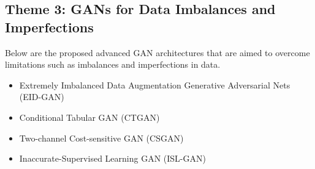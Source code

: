\documentclass[12pt,a4paper]{article}
\begin{document}





\subsection{Theme 3: GANs for Data Imbalances and Imperfections}
Below are the proposed advanced GAN architectures that are aimed to overcome limitations such as imbalances and imperfections in data.
\begin{itemize}
    \item Extremely Imbalanced Data Augmentation Generative Adversarial Nets (EID-GAN)
    \item Conditional Tabular GAN (CTGAN)
    \item Two-channel Cost-sensitive GAN (CSGAN)
    \item Inaccurate-Supervised Learning GAN (ISL-GAN)
\end{itemize}
\end{document}
